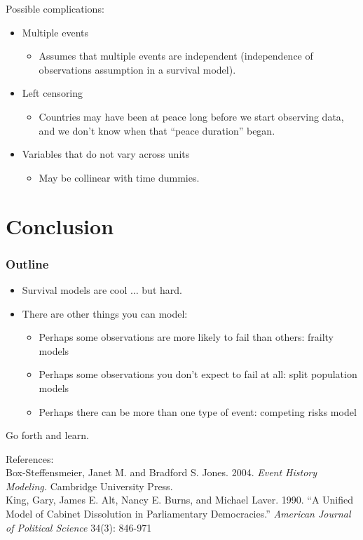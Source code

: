 \documentclass[handout]{beamer}
\begin{document}
\begin{frame}
Possible complications:
\pause
\begin{itemize}
\item Multiple events
\pause
\begin{itemize}
\item Assumes that multiple events are independent (independence of
observations assumption in a survival model).
\end{itemize}
\pause
\item Left censoring
\pause 
\begin{itemize}
\item Countries may have been at peace long before we start observing
data, and we don't know when that ``peace duration'' began.
\end{itemize}
\pause
\item Variables that do not vary across units
\pause
\begin{itemize}
\item May be collinear with time dummies.
\end{itemize}
\end{itemize}
\end{frame}

\section{Conclusion}


\begin{frame}
\frametitle{Outline}
\tableofcontents[currentsection]
\end{frame}

\begin{frame}
\begin{itemize}
\item Survival models are cool $\dots$ \pause but hard.
\pause
\item There are other things you can model:
\pause
\begin{itemize}
\item Perhaps some observations are more likely to fail
than others: frailty models
\pause
\item Perhaps some observations you don't expect to fail at all: split
population models
\pause
\item Perhaps there can be more than one type of event: competing
risks model
\end{itemize}
\pause
\end{itemize}
Go forth and learn.
\end{frame}

\begin{frame}
References:\\
\bigskip
Box-Steffensmeier, Janet M. and Bradford S. Jones.  2004. \emph{Event
History Modeling.} Cambridge University Press.\\
\bigskip
King, Gary, James E. Alt, Nancy E. Burns, and Michael Laver.  1990.
``A Unified Model of Cabinet Dissolution in Parliamentary
Democracies.''  \emph{American Journal of Political Science} 34(3): 846-971
\end{frame}
\end{document}
